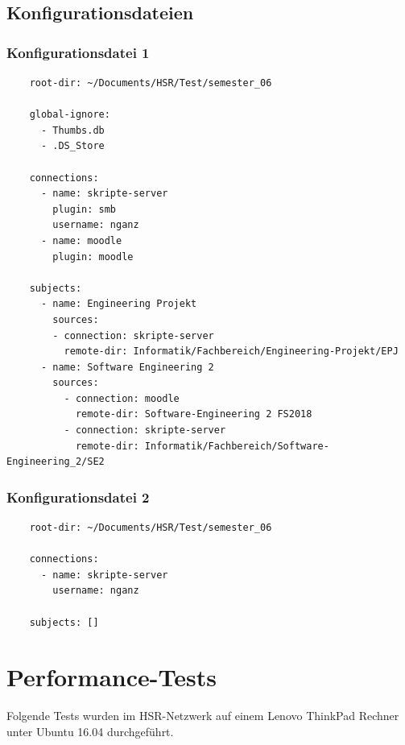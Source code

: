 \documentclass[a4paper]{article}
\let\oldsection\section
\renewcommand\section{\clearpage\oldsection}
\begin{document}
  \pagebreak

  \subsection{Konfigurationsdateien}

  \subsubsection{Konfigurationsdatei 1}

  \begin{verbatim}
    root-dir: ~/Documents/HSR/Test/semester_06

    global-ignore:
      - Thumbs.db
      - .DS_Store

    connections:
      - name: skripte-server
        plugin: smb
        username: nganz
      - name: moodle
        plugin: moodle

    subjects:
      - name: Engineering Projekt
        sources:
        - connection: skripte-server
          remote-dir: Informatik/Fachbereich/Engineering-Projekt/EPJ
      - name: Software Engineering 2
        sources:
          - connection: moodle
            remote-dir: Software-Engineering 2 FS2018
          - connection: skripte-server
            remote-dir: Informatik/Fachbereich/Software-Engineering_2/SE2
  \end{verbatim}

  \subsubsection{Konfigurationsdatei 2}

  \begin{verbatim}
    root-dir: ~/Documents/HSR/Test/semester_06

    connections:
      - name: skripte-server
        username: nganz

    subjects: []
  \end{verbatim}

  \section{Performance-Tests}

  Folgende Tests wurden im HSR-Netzwerk auf einem Lenovo ThinkPad Rechner unter Ubuntu 16.04 durchgeführt.
\end{document}
